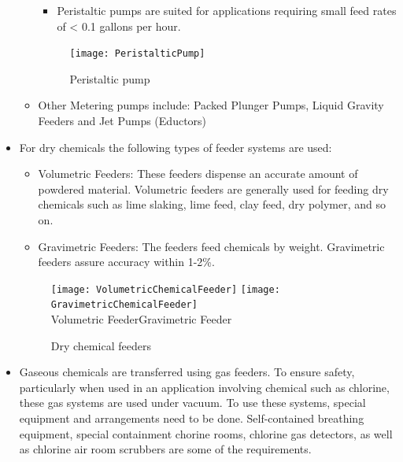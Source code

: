 \begin{itemize}
\begin{itemize}
\begin{itemize}
\item Peristaltic pumps are suited for applications requiring small feed rates of < 0.1 gallons per hour.
\end{itemize}
\begin{figure}[H]
\begin{center}
\texttt{[image: PeristalticPump]}\\
\caption{Peristaltic pump} 
\end{center}
\end{figure}
\item Other Metering pumps include: Packed Plunger Pumps, Liquid Gravity Feeders and Jet Pumps (Eductors)
\end{itemize}




\item For dry chemicals the following types of feeder systems are used:
\begin{itemize}
\item Volumetric Feeders: These feeders dispense an accurate amount of powdered material. Volumetric feeders are generally used for feeding dry chemicals such as lime slaking, lime feed, clay feed, dry polymer, and so on.
\item Gravimetric Feeders: The feeders feed chemicals by weight. Gravimetric feeders assure accuracy within 1-2\%.
\end{itemize}

\begin{figure}[H]
\begin{center}
\texttt{[image: VolumetricChemicalFeeder]} \hspace{0.7 cm}\texttt{[image: GravimetricChemicalFeeder]}\hspace{0.7 cm}\\
\vspace{0.2cm}
\hspace{1 cm}Volumetric Feeder\hspace{5 cm}Gravimetric Feeder\\
\caption{Dry chemical feeders}
\end{center}
\end{figure}


\item Gaseous chemicals are transferred using gas feeders. To ensure safety, particularly when used in an application involving chemical such as chlorine, these gas systems are used under vacuum. To use these systems, special equipment and arrangements need to be done. Self-contained breathing equipment, special containment chorine rooms, chlorine gas detectors, as well as chlorine air room scrubbers are some of the requirements.
\end{itemize}
